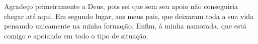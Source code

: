 \begin{agradecimentos}
Agradeço primeiramente a Deus, pois sei que sem seu apoio não conseguiria
chegar até aqui. Em segundo lugar, aos meus pais, que deixaram toda a sua vida
pensando unicamente na minha formação. Enfim, à minha namorada, que está
comigo e apoiando em todo o tipo de situação.
\end{agradecimentos}
